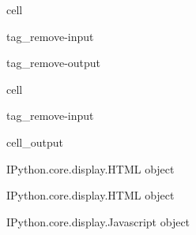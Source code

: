 \documentclass[letterpaper,10pt,english]{jupyterBook}
\begin{document}
\begin{sphinxuseclass}{cell}
\begin{sphinxuseclass}{tag_remove-input}
\begin{sphinxuseclass}{tag_remove-output}
\end{sphinxuseclass}
\end{sphinxuseclass}
\end{sphinxuseclass}
\begin{sphinxuseclass}{cell}
\begin{sphinxuseclass}{tag_remove-input}\begin{sphinxVerbatimOutput}

\begin{sphinxuseclass}{cell_output}
\begin{sphinxVerbatim}[commandchars=\\\{\}]

\end{sphinxVerbatim}

\begin{sphinxVerbatim}[commandchars=\\\{\}]
\PYGZlt{}IPython.core.display.HTML object\PYGZgt{}
\end{sphinxVerbatim}

\begin{sphinxVerbatim}[commandchars=\\\{\}]
\PYGZlt{}IPython.core.display.HTML object\PYGZgt{}
\end{sphinxVerbatim}

\begin{sphinxVerbatim}[commandchars=\\\{\}]
\PYGZlt{}IPython.core.display.Javascript object\PYGZgt{}
\end{sphinxVerbatim}

\end{sphinxuseclass}\end{sphinxVerbatimOutput}

\end{sphinxuseclass}
\end{sphinxuseclass}
\end{document}
